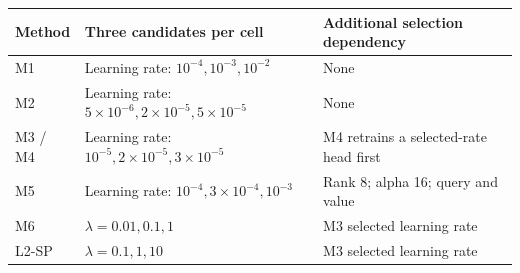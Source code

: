 \begin{tabular}{lp{61mm}p{63mm}}\toprule
Method & Three candidates per cell & Additional selection dependency\\\midrule
M1 & Learning rate: $10^{-4},10^{-3},10^{-2}$ & None\\
M2 & Learning rate: $5\!\times\!10^{-6},2\!\times\!10^{-5},5\!\times\!10^{-5}$ & None\\
M3 / M4 & Learning rate: $10^{-5},2\!\times\!10^{-5},3\!\times\!10^{-5}$ & M4 retrains a selected-rate head first\\
M5 & Learning rate: $10^{-4},3\!\times\!10^{-4},10^{-3}$ & Rank 8; alpha 16; query and value\\
M6 & $\lambda=0.01,0.1,1$ & M3 selected learning rate\\
L2-SP & $\lambda=0.1,1,10$ & M3 selected learning rate\\
\bottomrule\end{tabular}
